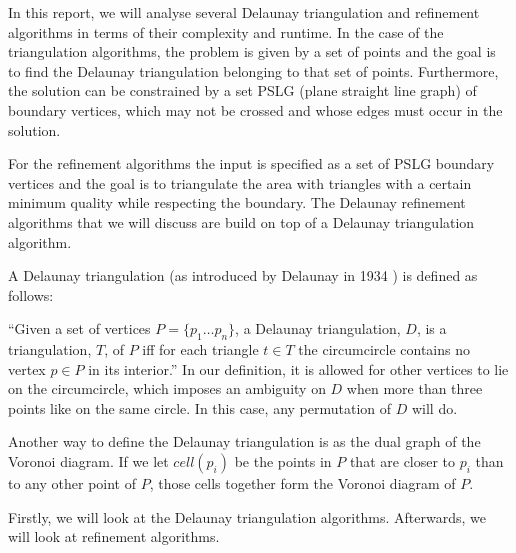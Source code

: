 In this report, we will analyse several Delaunay triangulation and refinement algorithms
in terms of their complexity and runtime.
In the case of the triangulation algorithms, the problem is given by a set of points and the goal is to find the Delaunay triangulation belonging to that set of points.
Furthermore, the solution can be constrained by a set PSLG (plane straight line graph) of
boundary vertices, which may not be crossed and whose edges must occur in the solution.

For the refinement algorithms the input is specified as a set of PSLG boundary vertices and
the goal is to triangulate the area with triangles with a certain minimum quality while respecting the boundary.
The Delaunay refinement algorithms that we will discuss are build on top of a Delaunay triangulation algorithm.

A Delaunay triangulation (as introduced by Delaunay in 1934 \cite{art:Delaunay1934}) is defined as follows:

``Given a set of vertices $P = \{p_1 \ldots p_n\}$, a Delaunay triangulation, $D$, is a triangulation, $T$, of $P$
iff for each triangle $t \in T$ the circumcircle contains no vertex $p \in P$ in its interior.''
In our definition, it is allowed for other vertices to lie on the circumcircle, which imposes an ambiguity on $D$
when more than three points like on the same circle. In this case, any permutation of $D$ will do.

Another way to define the Delaunay triangulation is as the dual graph of the Voronoi diagram.
If we let $cell(p_i)$ be the points in $P$ that are closer to $p_i$ than to any other point of $P$,
those cells together form the Voronoi diagram of $P$.

Firstly, we will look at the Delaunay triangulation algorithms.
Afterwards, we will look at refinement algorithms.


